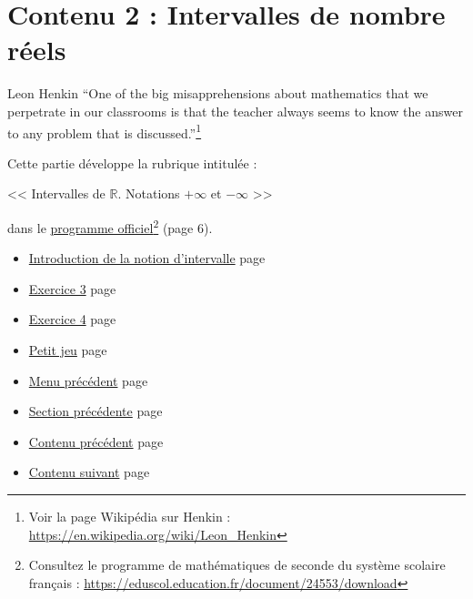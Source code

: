 \documentclass[a4paper,11pt]{book}
\begin{document}
\clearpage

\chapter{Contenu 2 : Intervalles de nombre réels}
\label{sec:org1fab813}
\label{org31d1c9a}
\label{page:sec2.2content2}

\begin{myquote}{Leon Henkin}
\enquote{One of the big misapprehensions about mathematics that we
perpetrate in our classrooms is that the teacher always seems to
know the answer to any problem that is discussed.}\footnote{Voir la page Wikipédia sur Henkin : \url{https://en.wikipedia.org/wiki/Leon_Henkin}}
\end{myquote}

\clearpage

Cette partie développe la rubrique intitulée :

<< Intervalles de \(\mathbb{R}\). Notations \(+\infty\) et \(-\infty\) >>

dans le \href{https://eduscol.education.fr/document/24553/download}{programme officiel}\footnote{Consultez le programme de mathématiques de seconde du système
scolaire français : \url{https://eduscol.education.fr/document/24553/download}} (page 6).

\clearpage

\label{org6170d36}
\label{page:content2-menu}
\begin{itemize}
\item \hyperref[orgac3c6cf]{Introduction de la notion d'intervalle}
page~\pageref{page:sec2.2.1intro-intervalle}
\item \hyperref[org61fbd6f]{Exercice 3}
page~\pageref{page:sec2.2.2exo3}
\item \hyperref[org6c6db0c]{Exercice 4}
page~\pageref{page:sec2.2.3exo4}
\item \hyperref[org2b18515]{Petit jeu}
page~\pageref{page:sec2.2.4small-game}
\item \hyperref[org2ce8f1f]{Menu précédent}
page~\pageref{page:content-menu}
\item \hyperref[orgce66a51]{Section précédente}
page~\pageref{page:sec2.1.8exo2}
\item \hyperref[orge386a9d]{Contenu précédent}
page~\pageref{page:sec2.1content1}
\item \hyperref[org0ecf993]{Contenu suivant}
page~\pageref{page:sec2.3content3}
\end{itemize}
\end{document}

